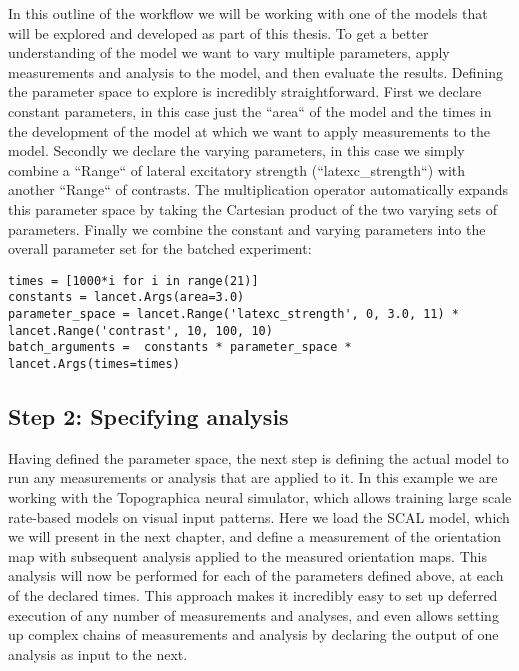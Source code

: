 In this outline of the workflow we will be working with one of the
models that will be explored and developed as part of this thesis. To
get a better understanding of the model we want to vary multiple
parameters, apply measurements and analysis to the model, and then
evaluate the results. Defining the parameter space to explore is
incredibly straightforward. First we declare constant parameters, in
this case just the ``area`` of the model and the times in the
development of the model at which we want to apply measurements to the
model. Secondly we declare the varying parameters, in this case we
simply combine a ``Range`` of lateral excitatory strength
(``latexc\_strength``) with another ``Range`` of contrasts. The
multiplication operator automatically expands this parameter space by
taking the Cartesian product of the two varying sets of
parameters. Finally we combine the constant and varying parameters
into the overall parameter set for the batched experiment:

\begin{minipage}{\linewidth}
\begin{lstlisting}
times = [1000*i for i in range(21)]
constants = lancet.Args(area=3.0)
parameter_space = lancet.Range('latexc_strength', 0, 3.0, 11) * lancet.Range('contrast', 10, 100, 10)
batch_arguments =  constants * parameter_space * lancet.Args(times=times)
\end{lstlisting}
\end{minipage}

\subsection{Step 2: Specifying analysis}

Having defined the parameter space, the next step is defining the
actual model to run any measurements or analysis that are applied
to it. In this example we are working with the Topographica neural
simulator, which allows training large scale rate-based models on
visual input patterns. Here we load the SCAL model, which we will
present in the next chapter, and define a measurement of the
orientation map with subsequent analysis applied to the measured orientation
maps. This analysis will now be performed for each of the parameters
defined above, at each of the declared times. This approach makes it incredibly
easy to set up deferred execution of any number of measurements and
analyses, and even allows setting up complex chains of measurements and
analysis by declaring the output of one analysis as input to the next.

